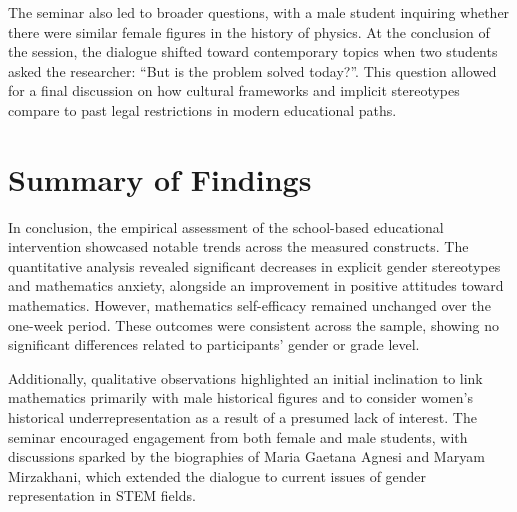 The seminar also led to broader questions, with a male student inquiring whether there were similar female figures in the history of physics. At the conclusion of the session, the dialogue shifted toward contemporary topics when two students asked the researcher: ``But is the problem solved today?''. This question allowed for a final discussion on how cultural frameworks and implicit stereotypes compare to past legal restrictions in modern educational paths.


\section{Summary of Findings}
In conclusion, the empirical assessment of the school-based educational intervention showcased notable trends across the measured constructs. The quantitative analysis revealed significant decreases in explicit gender stereotypes and mathematics anxiety, alongside an improvement in positive attitudes toward mathematics. However, mathematics self-efficacy remained unchanged over the one-week period. These outcomes were consistent across the sample, showing no significant differences related to participants' gender or grade level. 

Additionally, qualitative observations highlighted an initial inclination to link mathematics primarily with male historical figures and to consider women's historical underrepresentation as a result of a presumed lack of interest. The seminar encouraged engagement from both female and male students, with discussions sparked by the biographies of Maria Gaetana Agnesi and Maryam Mirzakhani, which extended the dialogue to current issues of gender representation in STEM fields.
